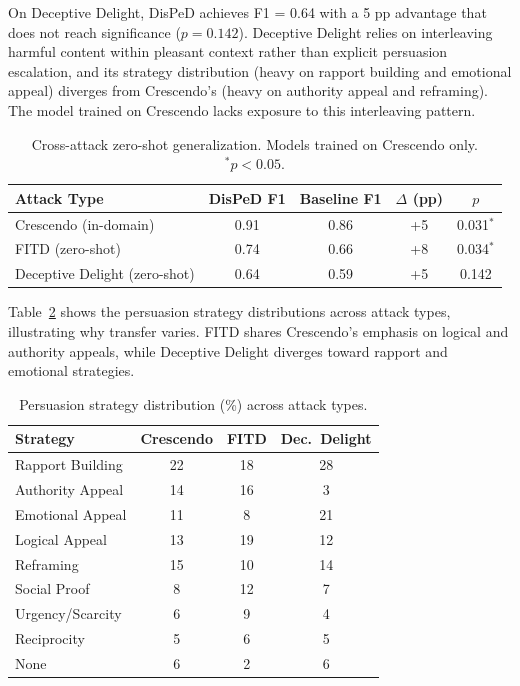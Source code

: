 \documentclass[11pt,a4paper]{article}
\begin{document}
On Deceptive Delight, DisPeD achieves F1 = 0.64 with a 5 pp advantage that does not reach significance ($p{=}0.142$).
Deceptive Delight relies on interleaving harmful content within pleasant context rather than explicit persuasion escalation, and its strategy distribution (heavy on rapport building and emotional appeal) diverges from Crescendo's (heavy on authority appeal and reframing).
The model trained on Crescendo lacks exposure to this interleaving pattern.

\begin{table}[t]
\centering
\small
\caption{Cross-attack zero-shot generalization. Models trained on Crescendo only. $^*p{<}0.05$.}
\label{tab:crossattack}
\begin{tabular}{lcccc}
\toprule
\textbf{Attack Type} & \textbf{DisPeD F1} & \textbf{Baseline F1} & \textbf{$\Delta$ (pp)} & \textbf{$p$} \\
\midrule
Crescendo (in-domain) & 0.91 & 0.86 & +5 & 0.031$^*$ \\
FITD (zero-shot) & 0.74 & 0.66 & +8 & 0.034$^*$ \\
Deceptive Delight (zero-shot) & 0.64 & 0.59 & +5 & 0.142 \\
\bottomrule
\end{tabular}
\end{table}

Table~\ref{tab:strategy_dist} shows the persuasion strategy distributions across attack types, illustrating why transfer varies.
FITD shares Crescendo's emphasis on logical and authority appeals, while Deceptive Delight diverges toward rapport and emotional strategies.

\begin{table}[t]
\centering
\small
\caption{Persuasion strategy distribution (\%) across attack types.}
\label{tab:strategy_dist}
\begin{tabular}{lccc}
\toprule
\textbf{Strategy} & \textbf{Crescendo} & \textbf{FITD} & \textbf{Dec.\ Delight} \\
\midrule
Rapport Building & 22 & 18 & 28 \\
Authority Appeal & 14 & 16 & 3 \\
Emotional Appeal & 11 & 8 & 21 \\
Logical Appeal & 13 & 19 & 12 \\
Reframing & 15 & 10 & 14 \\
Social Proof & 8 & 12 & 7 \\
Urgency/Scarcity & 6 & 9 & 4 \\
Reciprocity & 5 & 6 & 5 \\
None & 6 & 2 & 6 \\
\bottomrule
\end{tabular}
\end{table}
\end{document}
